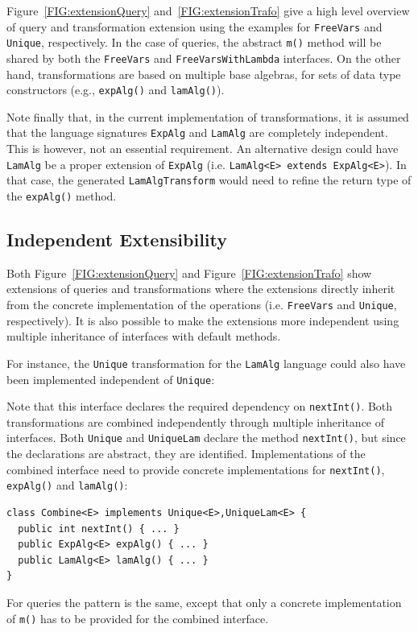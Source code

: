 Figure~\ref{FIG:extensionQuery} and~\ref{FIG:extensionTrafo} give a high level overview of query and transformation extension using the examples for {\small\texttt{FreeVars}} and \lstinline{Unique}, respectively.
In the case of queries, the abstract \lstinline{m()} method will be shared by both the \lstinline{FreeVars} and \lstinline{FreeVarsWithLambda} interfaces.
On the other hand, transformations are based on multiple base algebras, for sets of data type constructors (e.g., \lstinline{expAlg()} and \lstinline{lamAlg()}).

Note finally that, in the current implementation of \name transformations, it is assumed that the language signatures \lstinline{ExpAlg} and \lstinline{LamAlg} are completely independent.
This is however, not an essential requirement.
An alternative design could have \lstinline{LamAlg} be a proper extension of \lstinline{ExpAlg} (i.e. \lstinline{LamAlg<E> extends ExpAlg<E>}).
In that case, the generated \lstinline{LamAlgTransform} would need to refine the return type of the \lstinline{expAlg()} method.

\subsection{Independent Extensibility}

Both Figure~\ref{FIG:extensionQuery} and Figure~\ref{FIG:extensionTrafo} show extensions of queries and transformations where the extensions directly inherit from the concrete implementation of the operations (i.e. {\small\texttt{FreeVars}} and \lstinline{Unique}, respectively). It is also possible to make the extensions more independent using multiple inheritance of interfaces with default methods. 

For instance, the \lstinline{Unique} transformation for the \lstinline{LamAlg} language could also have been implemented independent of \lstinline{Unique}:


Note that this interface declares the required dependency on \lstinline{nextInt()}.
Both transformations are combined independently through multiple inheritance of interfaces.
Both \lstinline{Unique} and \lstinline{UniqueLam} declare the method \lstinline{nextInt()}, but since the declarations are abstract, they are identified. Implementations of the combined interface need to provide concrete implementations for \lstinline{nextInt()}, \lstinline{expAlg()} and \lstinline{lamAlg()}:

\begin{lstlisting}
class Combine<E> implements Unique<E>,UniqueLam<E> {
  public int nextInt() { ... }
  public ExpAlg<E> expAlg() { ... }
  public LamAlg<E> lamAlg() { ... }
}
\end{lstlisting}

For queries the pattern is the same, except that only a concrete implementation of \lstinline{m()} has to be provided for the combined interface. 
